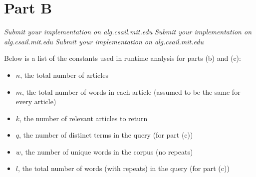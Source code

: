\documentclass[12pt,twoside]{article}
\begin{document}
\begin{problems}
\begin{problemparts}
\begin{enumerate}
\end{enumerate}

\end{problemparts}







\section*{Part B}

\problem
\begin{problemparts}
\problempart \emph{Submit your implementation on alg.csail.mit.edu}
\problempart \emph{Submit your implementation on alg.csail.mit.edu}
\problempart \emph{Submit your implementation on alg.csail.mit.edu}


\problempart Below is a list of the constants used in runtime analysis for parts (b) and (c):
\begin{itemize}
	\item $n$, the total number of articles
	\item $m$, the total number of words in each article (assumed to be the same for every article)
	\item $k$, the number of relevant articles to return
	\item $q$, the number of distinct terms in the query (for part (c))
	\item $w$, the number of unique words in the corpus (no repeats)
	\item $l$, the total number of words (with repeats) in the query (for part (c))
\end{itemize}


\newcommand{\functionb}{get-relevant-articles-tf-idf}
\newcommand{\functionc}{search}

\vspace{5mm}


\end{problemparts}
\end{problems}
\end{document}
